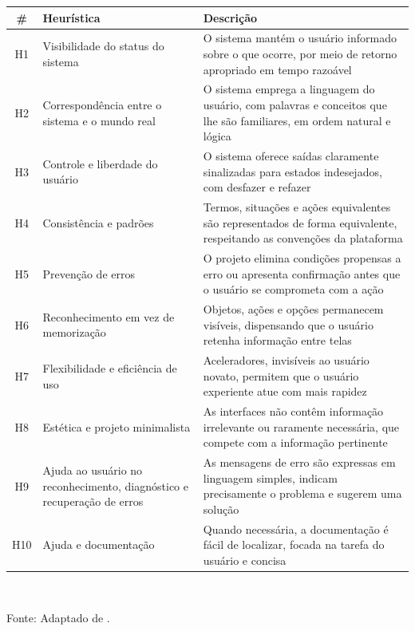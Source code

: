 \begin{quadro}[htb]
\centering
\caption{As dez heurísticas de usabilidade}
\label{quad:heuristicas}
\begin{tabular}{c p{4.0cm} p{6.4cm}}
\toprule
\textbf{\#} & \textbf{Heurística} & \textbf{Descrição} \\
\midrule
H1 & Visibilidade do status do sistema & O sistema mantém o usuário informado
sobre o que ocorre, por meio de retorno apropriado em tempo razoável \\
\addlinespace
H2 & Correspondência entre o sistema e o mundo real & O sistema emprega a
linguagem do usuário, com palavras e conceitos que lhe são familiares, em ordem
natural e lógica \\
\addlinespace
H3 & Controle e liberdade do usuário & O sistema oferece saídas claramente
sinalizadas para estados indesejados, com desfazer e refazer \\
\addlinespace
H4 & Consistência e padrões & Termos, situações e ações equivalentes são
representados de forma equivalente, respeitando as convenções da plataforma \\
\addlinespace
H5 & Prevenção de erros & O projeto elimina condições propensas a erro ou
apresenta confirmação antes que o usuário se comprometa com a ação \\
\addlinespace
H6 & Reconhecimento em vez de memorização & Objetos, ações e opções permanecem
visíveis, dispensando que o usuário retenha informação entre telas \\
\addlinespace
H7 & Flexibilidade e eficiência de uso & Aceleradores, invisíveis ao usuário
novato, permitem que o usuário experiente atue com mais rapidez \\
\addlinespace
H8 & Estética e projeto minimalista & As interfaces não contêm informação
irrelevante ou raramente necessária, que compete com a informação pertinente \\
\addlinespace
H9 & Ajuda ao usuário no reconhecimento, diagnóstico e recuperação de erros &
As mensagens de erro são expressas em linguagem simples, indicam precisamente o
problema e sugerem uma solução \\
\addlinespace
H10 & Ajuda e documentação & Quando necessária, a documentação é fácil de
localizar, focada na tarefa do usuário e concisa \\
\bottomrule
\end{tabular}
\\[4pt]
\begin{flushleft}
Fonte: Adaptado de .
\end{flushleft}
\end{quadro}

